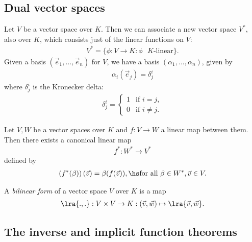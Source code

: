 \documentclass{article}
\begin{document}
\subsection{Dual vector spaces}

\begin{definition}
    Let $V$ be a vector space over $K$. Then we can associate a new vector space $V^*$,
    also over $K$, which consists just of the linear functions on $V$:
    \begin{align*}
        V^* = \{\phi : V\to K : \phi \text{ $K$-linear}\}.
    \end{align*}
    Given a basis $(\vec e_1,..., \vec e_n)$ for $V$, we have a basis $(\alpha_1, ..., \alpha_n)$,
    given by 
    \begin{align*}
        \alpha_i(\vec e_j) = \delta_j^i
    \end{align*}
    where $\delta_j^i$ is the Kronecker delta:
    \begin{align*}
        \delta_j^i=\begin{cases}
            1 &\text{if }i=j,\\
            0 &\text{if }i\not=j.
        \end{cases}
    \end{align*}
\end{definition}

\begin{definition}
    Let $V,W$ be a vector spaces over $K$ and $f:V\to W$ a linear map between them.
    Then there exists a canonical linear map 
    \begin{align*}
        f^*:W^*\to V^*
    \end{align*}
    defined by
    \begin{align*}
        \left(f^*(\beta)\right)(\vec v) = \beta(f(\vec v)), \hs\text{for all } \beta\in W^*,\vec v\in V.
    \end{align*}
\end{definition}

\begin{definition}
    A \emph{bilinear form} of a vector space $V$ over $K$ is a map
    \begin{align*}
        \lra{.,.} : V\times V \to K : (\vec v, \vec w) \mapsto \lra{\vec v, \vec w}.
    \end{align*}
\end{definition}

\subsection{The inverse and implicit function theorems}
\end{document}
